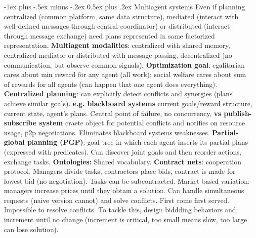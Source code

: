 \documentclass{article}
\makeatletter
\renewcommand{\section}{\@startsection{section}{1}{0mm}%
                                {-1ex plus -.5ex minus -.2ex}%
                                {0.5ex plus .2ex}%
                                {\color{blue}\normalfont\footnotesize\bfseries}}
\newcommand{\disadv}[1]{{\color{red} #1}}
\newcommand{\adv}[1]{{\color{green!60!blue} #1}}
\makeatother
\begin{document}
\begin{multicols*}{4}
\section{Multiagent systems}
Even if planning centralized (common platform, same data structure), mediated (interact with well-defined messages through central coordinator) or distributed (interact through message exchange) need plans represented in same factorized representation.
\textbf{Multiagent modalities}: centralized with shared memory, centralized mediator or distributed with message passing, decentralized (no communication, but observe common signals).
\textbf{Optimization goal}: egalitarian cares about min reward for any agent (all work); social welfare cares about sum of rewards for all agents (can happen that one agent does everything).
\textbf{Centralized planning}: can explicitly detect conflicts and synergies (plans achieve similar goals). \textbf{e.g. blackboard systems} current goals/reward structure, current state, agent's plans. \disadv{Central point of failure, no concurrency}, \textbf{vs publish-subscribe system} craete object for potential conflicts and notifies on resource usage, p2p negotiations. \adv{Eliminates blackboard systems weaknesses}.
\textbf{Partial-global planning (PGP)}: goal tree in which each agent inserts its partial plans (expressed with predicates). Can discover joint goals and then reorder actions, exchange tasks. \textbf{Ontologies: }Shared vocabulary.
\textbf{Contract nets}: cooperation protocol. Managers divide tasks, contractors place bids, contract is made for lowest bid (no negotiation). Tasks can be subcontracted. Market-based variation: managers increase prices until they obtain a solution. \adv{Can handle simultaneous requests (naive version cannot) and solve conflicts}. \disadv{First come first served. Impossible to resolve conflicts.} To tackle this, design biddding behaviors and increment until no change (increment is critical, too small means slow, too large can lose solution).


\end{multicols*}
\end{document}
